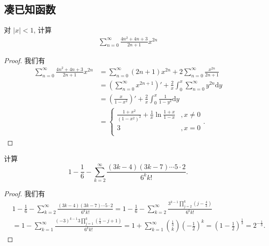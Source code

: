 \documentclass[../../main.tex]{subfiles}%
\begin{document}
\subsection{凑已知函数}

\begin{example}
对 \(|x| < 1\), 计算
\begin{align*}
\sum_{n=0}^{\infty} \frac{4n^2 + 4n + 3}{2n + 1} x^{2n}
\end{align*}
\end{example}
\begin{proof}
我们有
\begin{align*}
\sum_{n=0}^{\infty} \frac{4n^2 + 4n + 3}{2n + 1} x^{2n} &= \sum_{n=0}^{\infty} (2n + 1) x^{2n} + 2 \sum_{n=0}^{\infty} \frac{x^{2n}}{2n + 1} \\
&= \left( \sum_{n=0}^{\infty} x^{2n + 1} \right)' + \frac{2}{x} \int_{0}^{x} \sum_{n=0}^{\infty} y^{2n} \mathrm{d}y \\
&= \left( \frac{x}{1 - x^2} \right)' + \frac{2}{x} \int_{0}^{x} \frac{1}{1 - y^2} \mathrm{d}y \\
&=\begin{cases}
\frac{1+x^2}{(1-x^2)^2}+\frac{1}{x}\ln \frac{1+x}{1-x}&,x\ne 0\\
3&,x=0\\
\end{cases}.
\end{align*}
\end{proof}

\begin{example}
计算
\[
1 - \frac{1}{6} - \sum_{k=2}^{\infty} \frac{(3k - 4)(3k - 7) \cdots 5 \cdot 2}{6^k k!}.
\]
\end{example}
\begin{proof}
我们有
\begin{align*}
&1 - \frac{1}{6} - \sum_{k=2}^{\infty} \frac{(3k - 4)(3k - 7) \cdots 5 \cdot 2}{6^k k!}= 1 - \frac{1}{6} - \sum_{k=2}^{\infty} \frac{3^{k - 1} \prod\limits_{j=2}^{k} \left(j - \frac{4}{3}\right)}{6^k k!}\\
&= 1 - \sum_{k=1}^{\infty} \frac{(-3)^{k - 1} 3 \prod\limits_{j=1}^{k} \left(\frac{1}{3} - j + 1\right)}{6^k k!}= 1 + \sum_{k=1}^{\infty} \binom{\frac{1}{3}}{k} \left(-\frac{1}{2}\right)^k = \left(1 - \frac{1}{2}\right)^{\frac{1}{3}} = 2^{-\frac{1}{3}}.
\end{align*}
\end{proof}
\end{document}
